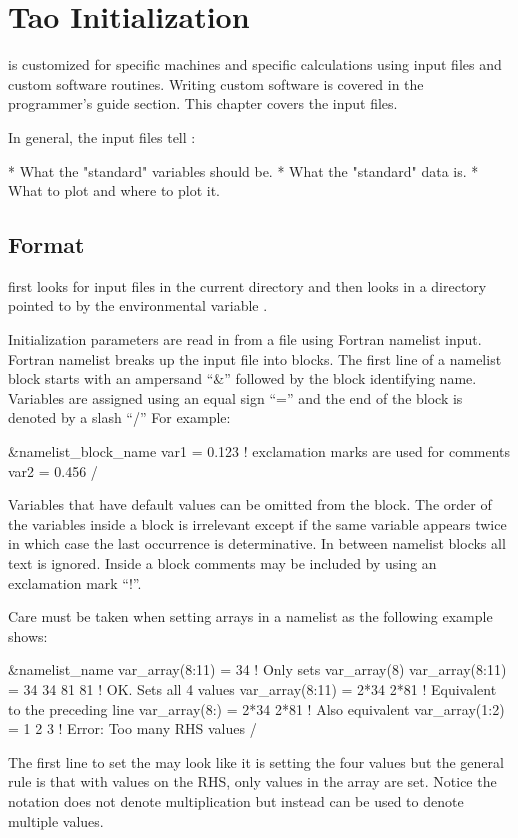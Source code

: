 \chapter{Tao Initialization}
\label{c:init}

\tao is customized for specific machines and specific calculations
using input files and custom software routines. Writing custom
software is covered in the programmer's guide section. This chapter
covers the input files.

In general, the input files tell \tao:
\begin{example}
  * What the "standard" variables should be.
  * What the "standard" data is.
  * What to plot and where to plot it.
\end{example}

\section{Format}
\label{s:format}

\tao first looks for input files in the current directory and then
looks in a directory pointed to by the environmental variable
.

Initialization parameters are read in from a file using Fortran
namelist input. Fortran namelist breaks up the input file into
blocks. The first line of a namelist block starts with an ampersand
``\&'' followed by the block identifying name. Variables are assigned
using an equal sign ``='' and the end of the block is denoted by a
slash ``/'' For example:
\begin{example}
  &namelist_block_name
    var1 = 0.123   ! exclamation marks are used for comments
    var2 = 0.456
  /
\end{example}
Variables that have default values can be omitted from the block.  The
order of the variables inside a block is irrelevant except if the
same variable appears twice in which case the last occurrence is determinative.
In between namelist blocks all text is ignored. Inside a block comments may be
included by using an exclamation mark ``!''.

Care must be taken when setting arrays in a namelist as the following example
shows:
\begin{example}
  &namelist_name
    var_array(8:11) = 34             ! Only sets var_array(8)
    var_array(8:11) = 34 34 81 81    ! OK. Sets all 4 values
    var_array(8:11) = 2*34 2*81      ! Equivalent to the preceding line
    var_array(8:)   = 2*34 2*81      ! Also equivalent
    var_array(1:2) = 1 2 3           ! Error: Too many RHS values
  /
\end{example}
The first line to set the  may look like it is setting 
the four values  but the general rule is that with 
values on the RHS, only  values in the array are set. Notice the notation
 does not denote multiplication but instead can be used to denote
multiple values.

